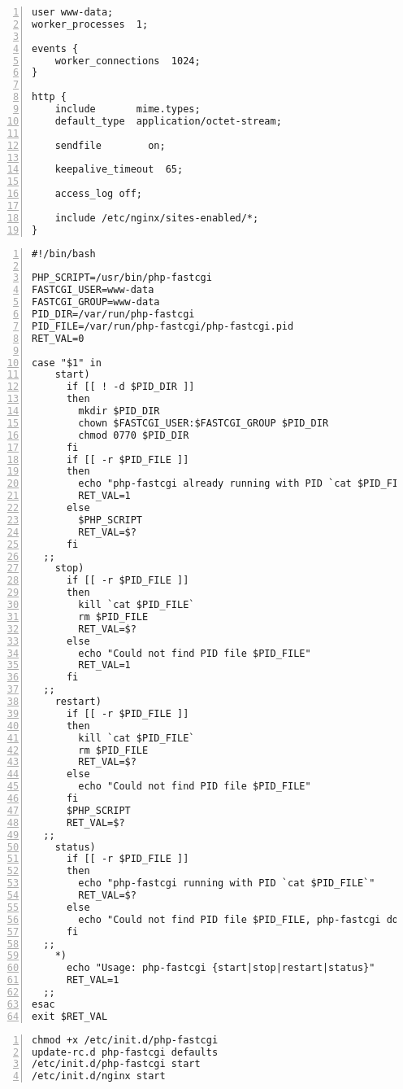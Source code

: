\documentclass[Configuration]{subfiles}
\begin{document}
\begin{lstlisting}[frame=single,caption=/etc/nginx/nginx.conf,backgroundcolor=\color{gray},breaklines=true,numbers=left,]
user www-data;
worker_processes  1;

events {
    worker_connections  1024;
}

http {
    include       mime.types;
    default_type  application/octet-stream;

    sendfile        on;

    keepalive_timeout  65;

    access_log off;

    include /etc/nginx/sites-enabled/*;
}
\end{lstlisting}

\begin{lstlisting}[frame=single,caption=/etc/init.d/php-fastcgi,backgroundcolor=\color{gray},breaklines=true,numbers=left,]
#!/bin/bash

PHP_SCRIPT=/usr/bin/php-fastcgi
FASTCGI_USER=www-data
FASTCGI_GROUP=www-data
PID_DIR=/var/run/php-fastcgi
PID_FILE=/var/run/php-fastcgi/php-fastcgi.pid
RET_VAL=0

case "$1" in
    start)
      if [[ ! -d $PID_DIR ]]
      then
        mkdir $PID_DIR
        chown $FASTCGI_USER:$FASTCGI_GROUP $PID_DIR
        chmod 0770 $PID_DIR
      fi
      if [[ -r $PID_FILE ]]
      then
        echo "php-fastcgi already running with PID `cat $PID_FILE`"
        RET_VAL=1
      else
        $PHP_SCRIPT
        RET_VAL=$?
      fi
  ;;
    stop)
      if [[ -r $PID_FILE ]]
      then
        kill `cat $PID_FILE`
        rm $PID_FILE
        RET_VAL=$?
      else
        echo "Could not find PID file $PID_FILE"
        RET_VAL=1
      fi
  ;;
    restart)
      if [[ -r $PID_FILE ]]
      then
        kill `cat $PID_FILE`
        rm $PID_FILE
        RET_VAL=$?
      else
        echo "Could not find PID file $PID_FILE"
      fi
      $PHP_SCRIPT
      RET_VAL=$?
  ;;
    status)
      if [[ -r $PID_FILE ]]
      then
        echo "php-fastcgi running with PID `cat $PID_FILE`"
        RET_VAL=$?
      else
        echo "Could not find PID file $PID_FILE, php-fastcgi does not appear to be running"
      fi
  ;;
    *)
      echo "Usage: php-fastcgi {start|stop|restart|status}"
      RET_VAL=1
  ;;
esac
exit $RET_VAL
\end{lstlisting}

\begin{lstlisting}[frame=single,caption=starting services,backgroundcolor=\color{gray},breaklines=true,numbers=left,]
chmod +x /etc/init.d/php-fastcgi
update-rc.d php-fastcgi defaults
/etc/init.d/php-fastcgi start
/etc/init.d/nginx start
\end{lstlisting}
\end{document}
